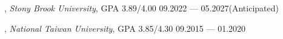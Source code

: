 


, \textit{Stony Brook University}, GPA 3.89/4.00	\hfill 09.2022 --- 05.2027(Anticipated)

, \textit{National Taiwan University}, GPA 3.85/4.30 \hfill	09.2015 --- 01.2020



